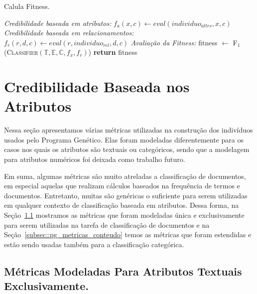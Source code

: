 \begin{algorithm}
\centering
\caption{Calula Fitness.}
\label{alg::fitness}
\begin{algorithmic}[1]
{
{}
  \State \textit{Credibilidade baseada em atributos:}
      \State $f_a(x,c) \gets eval(individuo_{attrs}, x, c)$
    \EndFor
  \EndFor
  \State \textit{Credibilidade baseada em relacionamentos:}
            \State $f_r(r,d,c) \gets eval(r,individuo_{rel}, d, c)$
        \EndFor
    \EndFor
  \EndFor
  \State \textit{Avaliação da Fitness:}
  \State fitness $\gets$ \textsc{F$_1$}(\textsc{Classifier}$(\mathbb{T}, \mathbb{E}, \mathbb{C}, f_x, f_r)$)
  \State \textbf{return} fitness
\EndFunction
}
\end{algorithmic}
\end{algorithm}

\section{Credibilidade Baseada nos Atributos}
\label{sec::pg_cred_baseada_conteudo}

Nessa seção apresentamos várias métricas utilizadas na construção dos indivíduos usados pelo Programa Genético. Elas foram modeladas diferentemente para os casos nos quais os atributos são textuais ou categóricos, sendo que a modelagem para atributos numéricos foi deixada como trabalho futuro. 

Em suma, algumas métricas são muito atreladas a classificação de documentos, em especial aquelas que realizam cálculos baseados na frequência de termos e documentos. 
Entretanto, muitas são genéricas o suficiente para serem utilizadas em qualquer contexto de classificação baseada em atributos.
Dessa forma, na Seção~\ref{subsec::pg_metricas_conteudo_textual} mostramos as métricas que foram modeladas única e exclusivamente para serem utilizadas na tarefa de classificação de documentos  e na Seção~\ref{subsec::pg_metricas_conteudo} temos as métricas que foram estendidas e estão sendo usadas também para a classificação categórica.

\subsection{Métricas Modeladas Para Atributos Textuais Exclusivamente.}
\label{subsec::pg_metricas_conteudo_textual}

